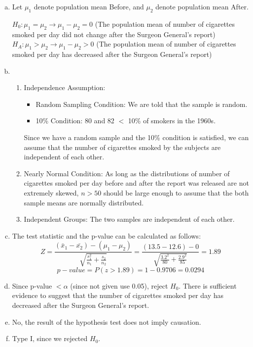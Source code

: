 {
\begin{enumerate}[(a)]
\item Let $\mu_1$ denote population mean Before, and $\mu_2$ denote population mean After.

$H_0: \mu_1 = \mu_2 \rightarrow \mu_1 - \mu_2 = 0$ (The population mean of number of cigarettes smoked per day did not change after the Surgeon General's report) \\
$H_A: \mu_1 > \mu_2 \rightarrow \mu_1 - \mu_2 > 0$ (The population mean of number of cigarettes smoked per day has decreased after the Surgeon General's report)

\item
\begin{enumerate}[1.]
\item Independence Assumption: 
\begin{itemize}
\item Random Sampling Condition: We are told that the sample is random.
\item 10\% Condition: 80 and 82 $<$ 10\% of smokers in the 1960s.
\end{itemize}
Since we have a random sample and the 10\% condition is satisfied, we can assume that the number of cigarettes smoked by the subjects are independent of each other.
\item Nearly Normal Condition: As long as the distributions of number of cigarettes smoked per day before and after the report was released are not extremely skewed, $n > 50$ should be large enough to assume that the both sample means are normally distributed.
\item Independent Groups: The two samples are independent of each other.
\end{enumerate}

\item The test statistic and the p-value can be calculated as follows:
\[ Z = \frac{(\bar{x}_1 - \bar{x_2}) - (\mu_1 - \mu_2)}{\sqrt{ \frac{s_1^2}{n_1} + \frac{s_2}{n_2} }} = \frac{(13.5 - 12.6) - 0}{ \sqrt{\frac{3.2^2}{80} + \frac{2.9^2}{85}} } = 1.89 \]
\[ p-value = P(z > 1.89) = 1 - 0.9706 = 0.0294 \]

\item Since p-value $< \alpha$ (since not given use 0.05), reject $H_0$. There is sufficient evidence to suggest that the number of cigarettes smoked per day has decreased after the Surgeon General's report.

\item No, the result of the hypothesis test does not imply causation.

\item Type I, since we rejected $H_0$.

\end{enumerate}
}\label{SterlingCooper}

